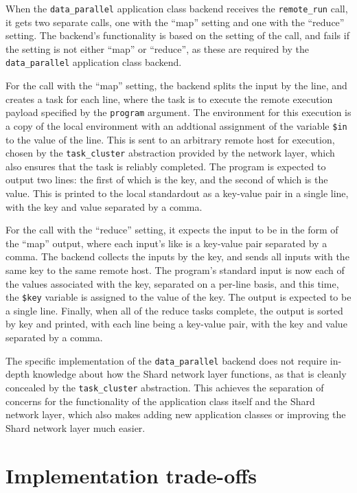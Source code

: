 \documentclass[twoside]{report}
\begin{document}
When the \texttt{data\_parallel} application class backend receives the \texttt{remote\_run} call, it gets two separate calls, one with the ``map'' setting and one with the ``reduce'' setting.
The backend's functionality is based on the setting of the call, and fails if the setting is not either ``map'' or ``reduce'', as these are required by the \texttt{data\_parallel} application class backend.

For the call with the ``map'' setting, the backend splits the input by the line, and creates a task for each line, where the task is to execute the remote execution payload specified by the \texttt{program} argument.
The environment for this execution is a copy of the local environment with an addtional assignment of the variable \texttt{\$in} to the value of the line.
This is sent to an arbitrary remote host for execution, chosen by the \texttt{task\_cluster} abstraction provided by the network layer, which also ensures that the task is reliably completed.
The program is expected to output two lines: the first of which is the key, and the second of which is the value.
This is printed to the local standardout as a key-value pair in a single line, with the key and value separated by a comma.

For the call with the ``reduce'' setting, it expects the input to be in the form of the ``map'' output, where each input's like is a key-value pair separated by a comma.
The backend collects the inputs by the key, and sends all inputs with the same key to the same remote host.
The program's standard input is now each of the values associated with the key, separated on a per-line basis, and this time, the \texttt{\$key} variable is assigned to the value of the key.
The output is expected to be a single line.
Finally, when all of the reduce tasks complete, the output is sorted by key and printed, with each line being a key-value pair, with the key and value separated by a comma.

The specific implementation of the \texttt{data\_parallel} backend does not require in-depth knowledge about how the Shard network layer functions, as that is cleanly concealed by the \texttt{task\_cluster} abstraction.
This achieves the separation of concerns for the functionality of the application class itself and the Shard network layer, which also makes adding new application classes or improving the Shard network layer much easier.

\section{Implementation trade-offs}
\end{document}
